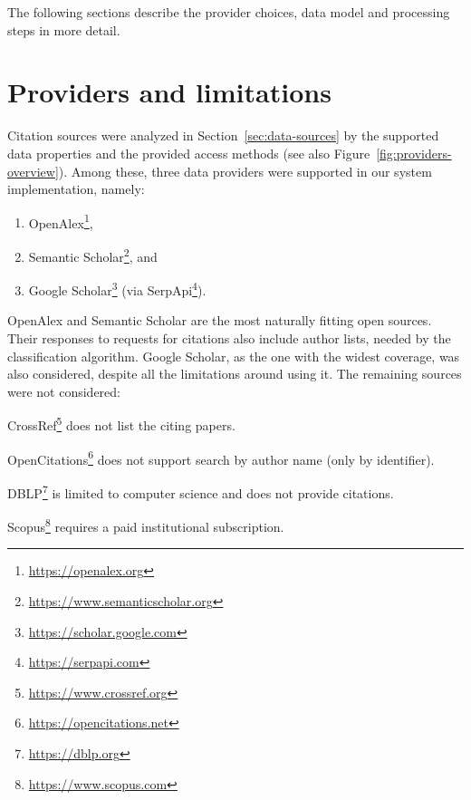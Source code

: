 The following sections describe the provider choices, data model and processing steps in more detail.


\section{Providers and limitations} \label{sec:providers}

Citation sources were analyzed in Section~\ref{sec:data-sources} by the supported data properties and the provided access methods (see also Figure~\ref{fig:providers-overview}). Among these, three data providers were supported in our system implementation, namely: 
\begin{enumerate}
\item
\textsf{OpenAlex}\footnote{\url{https://openalex.org}}, 
\item
\textsf{Semantic Scholar}\footnote{\url{https://www.semanticscholar.org}}, and
\item
\textsf{Google Scholar}\footnote{\url{https://scholar.google.com}} (via \textsf{SerpApi}\footnote{\url{https://serpapi.com}}).
\end{enumerate}
\textsf{OpenAlex} and \textsf{Semantic Scholar} are the most naturally fitting open sources.
Their responses to requests for citations also include author lists, needed by the classification algorithm.
\textsf{Google Scholar}, as the one with the widest coverage, was also considered, despite all the limitations around using it.
The remaining sources were not considered:

\begin{description}
    \item \textsf{CrossRef}\footnote{\url{https://www.crossref.org}} does not list the citing papers.
    \item \textsf{OpenCitations}\footnote{\url{https://opencitations.net}} does not support search by author name (only by identifier).
    \item \textsf{DBLP}\footnote{\url{https://dblp.org}} is limited to computer science and does not provide citations.
    \item \textsf{Scopus}\footnote{\url{https://www.scopus.com}} requires a paid institutional subscription.
\end{description}


